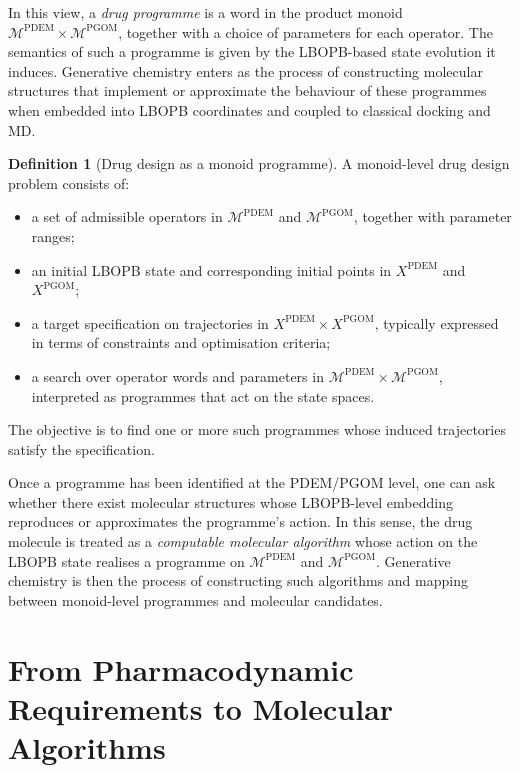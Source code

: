 \documentclass[11pt]{book}
\theoremstyle{plain}
\theoremstyle{definition}
\newtheorem{definition}[theorem]{Definition}
\theoremstyle{remark}
\begin{document}
In this view, a \emph{drug programme} is a word in the product monoid
$\mathcal{M}^{\mathrm{PDEM}} \times \mathcal{M}^{\mathrm{PGOM}}$,
together with a choice of parameters for each operator. The semantics
of such a programme is given by the LBOPB-based state evolution it
induces. Generative chemistry enters as the process of constructing
molecular structures that implement or approximate the behaviour of
these programmes when embedded into LBOPB coordinates and coupled to
classical docking and MD.

\begin{definition}[Drug design as a monoid programme]
A monoid-level drug design problem consists of:
\begin{itemize}
  \item a set of admissible operators in
        $\mathcal{M}^{\mathrm{PDEM}}$ and $\mathcal{M}^{\mathrm{PGOM}}$,
        together with parameter ranges;
  \item an initial LBOPB state and corresponding initial points in
        $X^{\mathrm{PDEM}}$ and $X^{\mathrm{PGOM}}$;
  \item a target specification on trajectories in
        $X^{\mathrm{PDEM}} \times X^{\mathrm{PGOM}}$, typically expressed
        in terms of constraints and optimisation criteria;
  \item a search over operator words and parameters in
        $\mathcal{M}^{\mathrm{PDEM}} \times \mathcal{M}^{\mathrm{PGOM}}$,
        interpreted as programmes that act on the state spaces.
\end{itemize}
The objective is to find one or more such programmes whose induced
trajectories satisfy the specification.
\end{definition}

Once a programme has been identified at the PDEM/PGOM level, one can
ask whether there exist molecular structures whose LBOPB-level
embedding reproduces or approximates the programme’s action. In this
sense, the drug molecule is treated as a \emph{computable molecular
algorithm} whose action on the LBOPB state realises a programme on
$\mathcal{M}^{\mathrm{PDEM}}$ and $\mathcal{M}^{\mathrm{PGOM}}$.
Generative chemistry is then the process of constructing such
algorithms and mapping between monoid-level programmes and molecular
candidates.

\section{From Pharmacodynamic Requirements to Molecular Algorithms}
\end{document}
